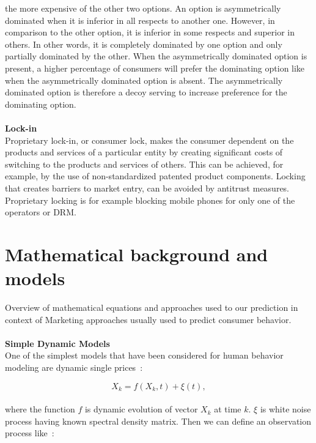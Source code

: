 the more expensive of the other two options. An option is asymmetrically dominated when it is inferior in all respects to another one.
However, in comparison to the other option, it is inferior in some respects and superior in others. In other words, it is completely
dominated by one option and only partially dominated by the other. When the asymmetrically dominated option is present, a higher
percentage of consumers will prefer the dominating option like when the asymmetrically dominated option is absent.
The asymmetrically dominated option is therefore a decoy serving to increase preference for the dominating option.\\
\\
\textbf{Lock-in} \label{subsec:lock-in}\\
Proprietary lock-in, or consumer lock, makes the consumer dependent on the products and services of a particular entity
by creating significant costs of switching to the products and services of others. This can be achieved, for example,
by the use of non-standardized patented product components. Locking that creates barriers to market entry, can be avoided by antitrust measures.
Proprietary locking is for example blocking mobile phones for only one of the operators or DRM.
\\
\section{Mathematical background and models} \label{sec:introduction}
Overview of mathematical equations and approaches used to our prediction in context of Marketing approaches usually used to predict consumer behavior.\\
\\
\textbf{Simple Dynamic Models} \label{subsec:simpleDynamicModels}\\
One of the simplest models that have been considered for human behavior modeling are dynamic single prices~\cite{pantland}:

\begin{equation} \label{eq:1}
X_k = f(X_k, t) + \xi(t),
\end{equation}
\\
where the function $f$ is dynamic evolution of vector $X_k$ at time $k$. $\xi$ is white noise process having known spectral density matrix.
Then we can define an observation process like~\cite{pantland}:

